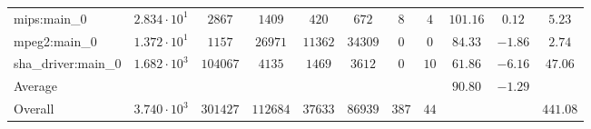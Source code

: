 \begin{tabular}{|l|c|c|c|c|c|c|c|c|c|c|}
mips:main\_0            & $ 2.834 \cdot 10^{1} $ & $ 2867   $ & $ 1409   $ & $ 420   $ & $ 672   $ & $ 8   $ & $ 4  $ & $ 101.16      $ & $ 0.12    $ & $ 5.23    $ \\
mpeg2:main\_0           & $ 1.372 \cdot 10^{1} $ & $ 1157   $ & $ 26971  $ & $ 11362 $ & $ 34309 $ & $ 0   $ & $ 0  $ & $ 84.33       $ & $ -1.86   $ & $ 2.74    $ \\
sha\_driver:main\_0     & $ 1.682 \cdot 10^{3} $ & $ 104067 $ & $ 4135   $ & $ 1469  $ & $ 3612  $ & $ 0   $ & $ 10 $ & $ 61.86       $ & $ -6.16   $ & $ 47.06   $ \\
\hline
Average                 & $                    $ & $        $ & $        $ & $       $ & $       $ & $     $ & $    $ & $ 90.80       $ & $ -1.29   $ & $         $ \\
\hline
Overall                 & $ 3.740 \cdot 10^{3} $ & $ 301427 $ & $ 112684 $ & $ 37633 $ & $ 86939 $ & $ 387 $ & $ 44 $ & $             $ & $         $ & $ 441.08  $ \\
\hline
\end{tabular}
